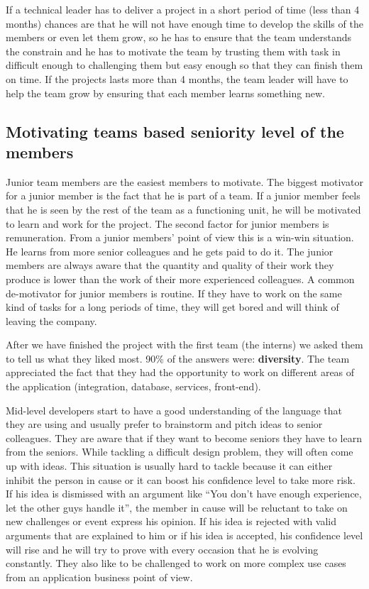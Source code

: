 
If a technical leader has to deliver a project in a short period of time (less than 4 months) chances are that he will not have enough time to develop the skills of the members or even let them grow, so he has to ensure that the team understands the constrain and he has to motivate the team by trusting them with task in difficult enough to challenging them but easy enough so that they can finish them on time. If the projects lasts more than 4 months, the team leader will have to help the team grow by ensuring that each member learns something new.

\subsection{Motivating teams based seniority level of the members}
Junior team members are the easiest members to motivate. The biggest motivator for a junior member is the fact that he is part of a team. If a junior member feels that he is seen by the rest of the team as a functioning unit, he will be motivated to learn and work for the project. The second factor for junior members is remuneration. From a junior members' point of view this is a win-win situation. He learns from more senior colleagues and he gets paid to do it. The junior members are always aware that the quantity and quality of their work they produce is lower than the work of their more experienced colleagues. A common de-motivator for junior members is routine. If they have to work on the same kind of tasks for a long periods of time, they will get bored and will think of leaving the company.

After we have finished the project with the first team (the interns) we asked them to tell us what they liked most. 90\% of the answers were: \textbf{diversity}. The team appreciated the fact that they had the opportunity to work on different areas of the application (integration, database, services, front-end). 

Mid-level developers start to have a good understanding of the language that they are using and usually prefer to brainstorm and pitch ideas to senior colleagues. They are aware that if they want to become seniors they have to learn from the seniors. While tackling a difficult design problem, they will often come up with ideas. This situation is usually hard to tackle because it can either inhibit the person in cause or it can boost his confidence level to take more risk. If his idea is dismissed with an argument like ``You don't have enough experience, let the other guys handle it'', the member in cause will be reluctant to take on new challenges or event express his opinion. If his idea is rejected with valid arguments that are explained to him or if his idea is accepted, his confidence level will rise and he will try to prove with every occasion that he is evolving constantly. They also like to be challenged to work on more complex use cases from an application business point of view.

